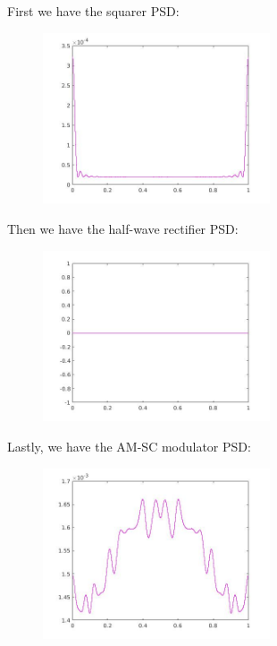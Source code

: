 \documentclass[a4paper,11pt]{article}
\begin{document}
First we have the squarer PSD:
\begin{figure}[!hp]
    \begin{center}
    \includegraphics[width=0.6\textwidth]{images/lab3_28.jpg}
    \end{center}
\end{figure}

\newpage

Then we have the half-wave rectifier PSD:

\begin{figure}[!hp]
    \begin{center}
    \includegraphics[width=0.6\textwidth]{images/lab3_38.jpg}
    \end{center}
\end{figure}

Lastly, we have the AM-SC modulator PSD:

\begin{figure}[!hp]
    \begin{center}
    \includegraphics[width=0.6\textwidth]{images/lab3_48.jpg}
    \end{center}
\end{figure}
\end{document}
